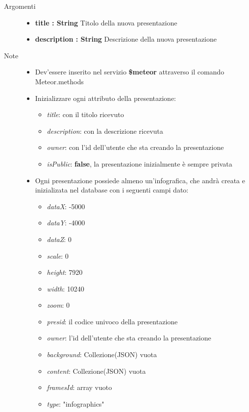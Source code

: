 \begin{description}
\begin{description}
		\begin{description}
			\item[Argomenti] \hfill
				\begin{itemize}
				
					\item \textbf{title : String			} \hfill
					Titolo della nuova presentazione
					\item \textbf{description : String			} \hfill
					Descrizione della nuova presentazione
					
				\end{itemize}
			\item[Note] \hfill
			\begin{itemize}
					\item Dev'essere inserito nel servizio \textbf{\$meteor} attraverso il comando Meteor.methods
					\item Inizializzare ogni attributo della presentazione:
					\begin{itemize}
					\item \textit{title}: con il titolo ricevuto
					\item \textit{description}: con la descrizione ricevuta
					\item \textit{owner}: con l'id dell'utente che sta creando la presentazione
					\item \textit{isPublic}: \textbf{false}, la presentazione inizialmente è sempre privata
					\end{itemize}
					\item Ogni presentazione possiede almeno un'infografica, che andrà creata e inizializata nel database con i seguenti campi dato:
					\begin{itemize}
					\item \textit{dataX}: -5000
					\item \textit{dataY}: -4000
					\item \textit{dataZ}: 0
					\item \textit{scale}: 0
					\item \textit{height}: 7920
					\item \textit{width}: 10240
					\item \textit{zoom}: 0
					\item \textit{presid}: il codice univoco della presentazione
					\item \textit{owner}: l'id dell'utente che sta creando la presentazione
					\item \textit{background}: Collezione(JSON) vuota
					\item \textit{content}: Collezione(JSON) vuota
					\item \textit{framesId}: array vuoto
					\item \textit{type}: "infographics"
					\end{itemize}
				\end{itemize}
		\end{description}
	\end{description}


\end{description}
